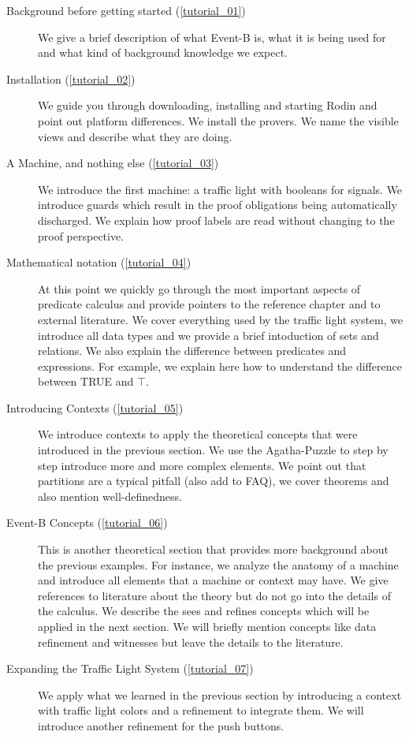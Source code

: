 \begin{description}
	\item[Background before getting started (\ref{tutorial_01})] We give a brief description of what Event-B is, what it is being used for and what kind of background knowledge we expect.
	\item[Installation (\ref{tutorial_02})] We guide you through downloading, installing and starting Rodin and point out platform differences.  We install the provers.  We name the visible views and describe what they are doing.
	\item[A Machine, and nothing else (\ref{tutorial_03})] We introduce the first machine: a traffic light with booleans for signals.  We introduce guards which result in the proof obligations being automatically discharged.  We explain how proof labels are read without changing to the proof perspective.
	\item[Mathematical notation (\ref{tutorial_04})] At this point we quickly go through the most important aspects of predicate calculus and provide pointers to the reference chapter and to external literature.  We cover everything used by the traffic light system, we introduce all data types and we provide a brief intoduction of sets and relations.  We also explain the difference between predicates and expressions. For example, we explain here how to understand the difference between TRUE and $\top$.  
	\item[Introducing Contexts (\ref{tutorial_05})] We introduce contexts to apply the theoretical concepts that were introduced in the previous section.  We use the Agatha-Puzzle to step by step introduce more and more complex elements.  We point out that partitions are a typical pitfall (also add to FAQ), we cover theorems and also mention well-definedness.
	\item[Event-B Concepts (\ref{tutorial_06})] This is another theoretical section that provides more background about the previous examples.  For instance, we analyze the anatomy of a machine and introduce all elements that a machine or context may have. We give references to literature about the theory but do not go into the details of the  calculus.  We describe the sees and refines concepts which will be applied in the next section.  We will briefly mention concepts like data refinement and witnesses but leave the details to the literature.
	\item[Expanding the Traffic Light System (\ref{tutorial_07})]  We apply what we learned in the previous section by introducing a context with traffic light colors and a refinement to integrate them.  We will introduce another refinement for the push buttons.


\end{description}
